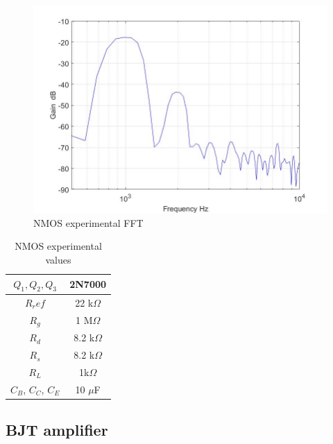 \begin{figure}[H]
	\centering
	\includegraphics[width=0.7\linewidth]{ExperimentalImplementation/nmos_fft.jpg}
	\caption{NMOS experimental FFT}
	\label{fig:nmosfft}
\end{figure}




\begin{table}[H]
	\centering
	\caption{NMOS experimental values}
	\label{tab:nmosexp}
	\begin{tabular}{cc}
		$Q_1, Q_2, Q_3$ & 2N7000        \\ \hline
		$R_ref$         & 22 k$\Omega$ \\ \hline
		$R_g$           & 1 M$\Omega$  \\ \hline
		$R_d$           & 8.2 k$\Omega$   \\ \hline
		$R_s$           & 8.2 k$\Omega$  \\ \hline
		$R_L$           & 1k$\Omega$    \\ \hline
		$C_B$, $C_C$, $C_E$ & 10 $\mu$F         \\ \hline   
	\end{tabular}
\end{table}



\subsection{BJT amplifier}


